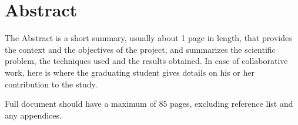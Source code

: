 \graphicspath{{chapters/01_abstract}}
\chapter*{Abstract}

The Abstract is a short summary, usually about 1 page in length, that provides the context
and the objectives of the project, and summarizes the scientific problem, the techniques used
and the results obtained. In case of collaborative work, here is where the graduating student
gives details on his or her contribution to the study.


Full document should have a maximum of 85 pages, excluding reference list and any appendices.
